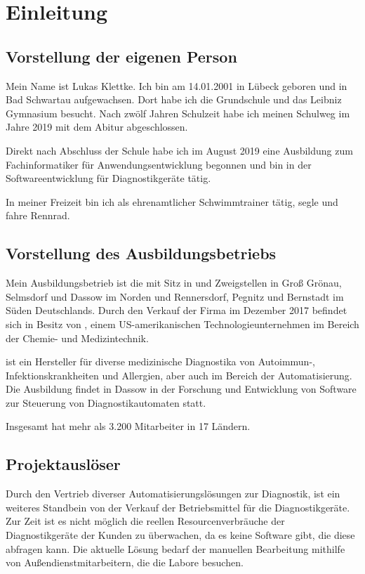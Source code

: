 \section{Einleitung}
\label{sec:Einleitung}

\subsection{Vorstellung der eigenen Person} 
\label{sec:eigene Person}
Mein Name ist Lukas Klettke. Ich bin am 14.01.2001 in Lübeck geboren und in Bad Schwartau aufgewachsen. Dort habe ich die Grundschule und das Leibniz Gymnasium besucht. Nach zwölf Jahren Schulzeit habe ich meinen Schulweg im Jahre 2019 mit dem Abitur abgeschlossen.

Direkt nach Abschluss der Schule habe ich im August 2019 eine Ausbildung zum Fachinformatiker für Anwendungsentwicklung begonnen und bin in der Softwareentwicklung für Diagnostikgeräte tätig.

In meiner Freizeit bin ich als ehrenamtlicher Schwimmtrainer tätig, segle und fahre Rennrad.

\subsection{Vorstellung des Ausbildungsbetriebs} 
\label{sec:Ausbildungsbetrieb}
Mein Ausbildungsbetrieb ist die {\betriebName} mit Sitz in {\betriebOrt} und Zweigstellen in Groß Grönau, Selmsdorf und Dassow im Norden und Rennersdorf, Pegnitz und Bernstadt im Süden Deutschlands. Durch den Verkauf der Firma im Dezember 2017 befindet sich {\betriebNameKzf} in Besitz von {\mutterBetriebName}, einem US-amerikanischen Technologieunternehmen im Bereich der Chemie- und Medizintechnik.

{\betriebNameKzf} ist ein Hersteller für diverse medizinische Diagnostika von Autoimmun-, Infektionskrankheiten und Allergien, aber auch im Bereich der Automatisierung. Die Ausbildung findet in Dassow in der Forschung und Entwicklung von Software zur Steuerung von Diagnostikautomaten statt.

Insgesamt hat {\betriebNameKzf} mehr als 3.200 Mitarbeiter in 17 Ländern.

\subsection{Projektauslöser} 
\label{sec:Projektauslöser}
Durch den Vertrieb diverser Automatisierungslösungen zur Diagnostik, ist ein weiteres Standbein von {\betriebNameKzf} der Verkauf der Betriebsmittel für die Diagnostikgeräte. Zur Zeit ist es nicht möglich die reellen Resourcenverbräuche der Diagnostikgeräte der Kunden zu überwachen, da es keine Software gibt, die diese abfragen kann. Die aktuelle Lösung bedarf der manuellen Bearbeitung mithilfe von Außendienstmitarbeitern, die die Labore besuchen.

